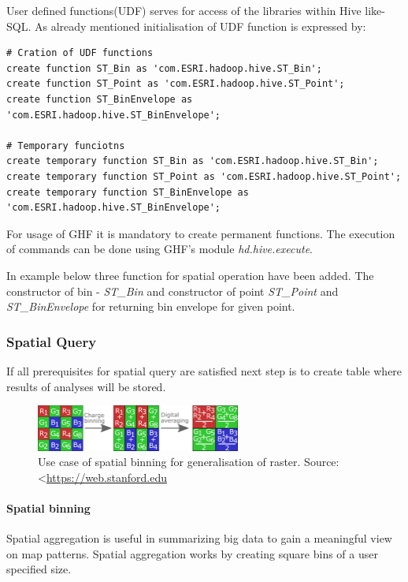 \documentclass[a4paper,12pt,oneside]{report}
\begin{document}
	User defined functions(UDF) serves for access of the libraries within Hive like-SQL.
	As already mentioned initialisation of UDF function is expressed by:
\begin{footnotesize}
	\begin{lstlisting}[style=python]
# Cration of UDF functions
create function ST_Bin as 'com.ESRI.hadoop.hive.ST_Bin';
create function ST_Point as 'com.ESRI.hadoop.hive.ST_Point';
create function ST_BinEnvelope as 'com.ESRI.hadoop.hive.ST_BinEnvelope';

# Temporary funciotns 
create temporary function ST_Bin as 'com.ESRI.hadoop.hive.ST_Bin';
create temporary function ST_Point as 'com.ESRI.hadoop.hive.ST_Point';
create temporary function ST_BinEnvelope as 'com.ESRI.hadoop.hive.ST_BinEnvelope';
		\end{lstlisting}
	\end{footnotesize}
	For usage of GHF it is mandatory  to create permanent functions. The execution of
	commands can be done using GHF's module \textit{hd.hive.execute}.
	
	In example below three function for spatial operation have been added. The
	constructor of bin - \textit{ST\_Bin} and constructor of point
	\textit{ST\_Point} and \textit{ST\_BinEnvelope} for returning bin envelope for
	given point.

\subsubsection{Spatial Query}
		If all prerequisites for spatial query are satisfied next step is to create
	table where results of analyses will be stored. 
	

\begin{figure}[!htbp]
	\centering
	\includegraphics[width=0.6\textwidth]{./img/binning.png}
	\caption[GHF workflow]{\centering Use case of spatial binning for
	generalisation of raster.
	Source: \textless\url{https://web.stanford.edu}}
	\label{map_cz}
\end{figure} 
\paragraph{Spatial binning}
	 Spatial aggregation is  useful in summarizing big data to gain a meaningful
	view on map patterns. Spatial aggregation works by creating square bins of a
	user specified size.
\end{document}
